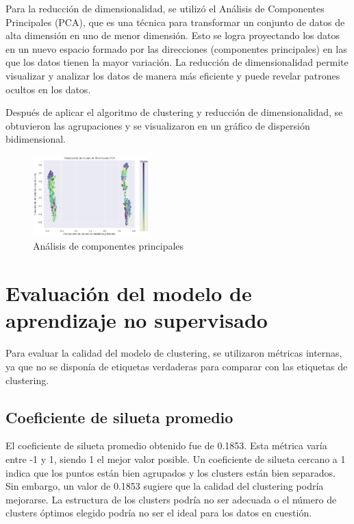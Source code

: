 \documentclass{wsdcr}
\begin{document}
Para la reducción de dimensionalidad, se utilizó el Análisis de Componentes Principales (PCA), que es una técnica para transformar un conjunto de datos de alta dimensión en uno de menor dimensión. Esto se logra proyectando los datos en un nuevo espacio formado por las direcciones (componentes principales) en las que los datos tienen la mayor variación. La reducción de dimensionalidad permite visualizar y analizar los datos de manera más eficiente y puede revelar patrones ocultos en los datos.

Después de aplicar el algoritmo de clustering y reducción de dimensionalidad, se obtuvieron las agrupaciones y se visualizaron en un gráfico de dispersión bidimensional.

\begin{figure}[h]
    \centering
    \includegraphics[width=0.4\textwidth]{charts/pca.png}
    \caption{Análisis de componentes principales}
    \label{fig:principalcomponentanalysis}
\end{figure}

\section{Evaluación del modelo de aprendizaje no supervisado}

Para evaluar la calidad del modelo de clustering, se utilizaron métricas internas, ya que no se disponía de etiquetas verdaderas para comparar con las etiquetas de clustering.

\subsection{Coeficiente de silueta promedio}

El coeficiente de silueta promedio obtenido fue de 0.1853. Esta métrica varía entre -1 y 1, siendo 1 el mejor valor posible. Un coeficiente de silueta cercano a 1 indica que los puntos están bien agrupados y los clusters están bien separados. Sin embargo, un valor de 0.1853 sugiere que la calidad del clustering podría mejorarse. La estructura de los clusters podría no ser adecuada o el número de clusters óptimos elegido podría no ser el ideal para los datos en cuestión.
\end{document}
